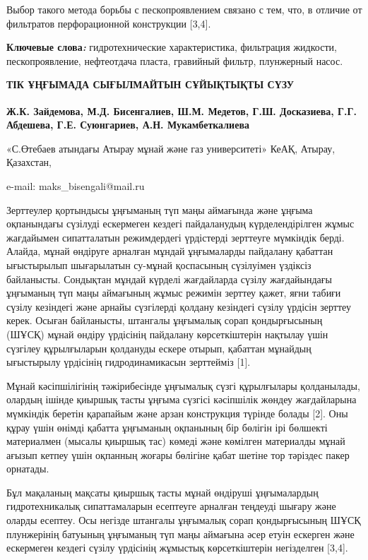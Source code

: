 Выбор такого метода борьбы с пескопроявлением связано с тем, что, в
отличие от фильтратов перфорационной конструкции {[}3,4{]}.

{\bfseries Ключевые слова\emph{:}} гидротехнические характеристика,
фильтрация жидкости, пескопроявление, нефтеотдача пласта, гравийный
фильтр, плунжерный насос.

\begin{articleheader}
{\bfseries ТІК ҰҢҒЫМАДА СЫҒЫЛМАЙТЫН СҰЙЫҚТЫҚТЫ СҮЗУ}

{\bfseries
Ж.К. Зайдемова,
М.Д. Бисенгалиев\textsuperscript{\envelope },
Ш.М. Медетов,
Г.Ш. Досказиева,
Г.Г. Абдешева,
Г.Е. Суюнгариев,
А.Н. Мукамбеткалиева
}
\end{articleheader}

\begin{affiliation}
«С.Өтебаев атындағы Атырау мұнай және газ университеті» КеАҚ, Атырау, Қазахстан,

e-mail: maks\_bisengali@mail.ru
\end{affiliation}

Зерттеулер қортындысы ұңғыманың түп маңы аймағында және ұңғыма
оқпанындағы сүзілуді ескермеген кездегі пайдаланудың күрделендірілген
жұмыс жағдайымен сипатталатын режимдердегі үрдістерді зерттеуге
мүмкіндік берді. Алайда, мұнай өндіруге арналған мұндай ұңғымаларды
пайдалану қабаттан ығыстырылып шығарылатын су-мұнай қоспасының
сүзілуімен үздіксіз байланысты. Сондықтан мұндай күрделі жағдайларда
сүзілу жағдайындағы ұңғыманың түп маңы аймағының жұмыс режимін зерттеу
қажет, яғни табиғи сүзілу кезіндегі және арнайы сүзгілерді қолдану
кезіндегі сүзілу үрдісін зерттеу керек. Осыған байланысты, штангалы
ұңғымалық сорап қондырғысының (ШҰСҚ) мұнай өндіру үрдісінің пайдалану
көрсеткіштерін нақтылау үшін сүзгілеу құрылғыларын қолдануды ескере
отырып, қабаттан мұнайдың ығыстырылу үрдісінің гидродинамикасын
зерттейміз {[}1{]}.

Мұнай кәсіпшілігінің тәжірибесінде ұңғымалық сүзгі құрылғылары
қолданылады, олардың ішінде қиыршық тасты ұңғыма сүзгісі кәсіпшілік
жөндеу жағдайларына мүмкіндік беретін қарапайым және арзан конструкция
түрінде болады {[}2{]}. Оны құрау үшін өнімді қабатта ұңғыманың
оқпанының бір бөлігін ірі бөлшекті материалмен (мысалы қиыршық тас)
көмеді және көмілген материалды мұнай ағызып кетпеу үшін оқпанның жоғары
бөлігіне қабат шетіне тор тәріздес пакер орнатады.

Бұл мақаланың мақсаты қиыршық тасты мұнай өндіруші ұңғымалардың
гидротехникалық сипаттамаларын есептеуге арналған теңдеуді шығару және
оларды есептеу. Осы негізде штангалы ұңғымалық сорап қондырғысының ШҰСҚ
плунжерінің батуының ұңғыманың түп маңы аймағына әсер етуін ескерген
және ескермеген кездегі сүзілу үрдісінің жұмыстық көрсеткіштерін
негізделген {[}3,4{]}.

